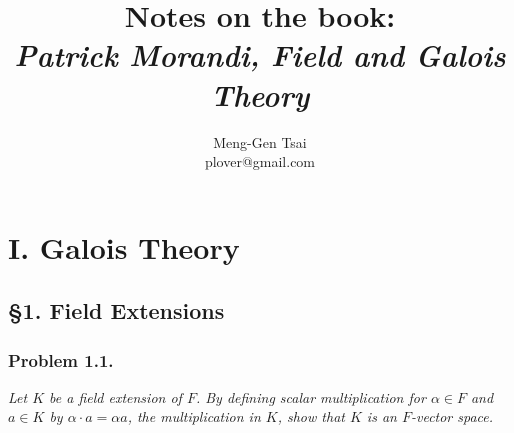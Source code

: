 \documentclass{article}
\title{\textbf{Notes on the book: \\ \emph{Patrick Morandi, Field and Galois Theory}}}
\author{Meng-Gen Tsai \\ plover@gmail.com}
\begin{document}
\maketitle
\tableofcontents












\newpage
\section*{I. Galois Theory \\}



\subsection*{\S 1. Field Extensions \\}



\subsubsection*{Problem 1.1.}
\emph{Let $K$ be a field extension of $F$.
By defining scalar multiplication for $\alpha \in F$ and $a \in K$
by $\alpha \cdot a = \alpha a$, the multiplication in $K$,
show that $K$ is an $F$-vector space.} \\
\end{document}
